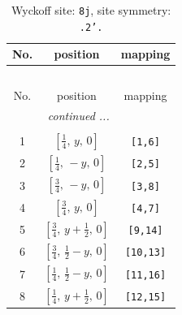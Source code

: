 \documentclass[fleqn,8pt]{jsarticle}
\begin{document}
\begin{longtable}{ccc}
\caption{Wyckoff site: {\tt 8j}, site symmetry: {\tt .2'.}}
 \\
 \hline \hline
No. & position & mapping \\ \hline \endfirsthead

\multicolumn{2}{l}{\tablename\ \thetable{}} \\
 \hline \hline
No. & position & mapping \\ \hline \endhead

 \hline \hline
\multicolumn{2}{r}{\footnotesize\it continued ...} \\ \endfoot

 \hline \hline
\multicolumn{2}{r}{} \\ \endlastfoot

1 & $\left[ \frac{1}{4},\, y,\, 0 \right]$ & {\tt [1,6]} \\ \hline
2 & $\left[ \frac{1}{4},\, - y,\, 0 \right]$ & {\tt [2,5]} \\ \hline
3 & $\left[ \frac{3}{4},\, - y,\, 0 \right]$ & {\tt [3,8]} \\ \hline
4 & $\left[ \frac{3}{4},\, y,\, 0 \right]$ & {\tt [4,7]} \\ \hline
5 & $\left[ \frac{3}{4},\, y + \frac{1}{2},\, 0 \right]$ & {\tt [9,14]} \\ \hline
6 & $\left[ \frac{3}{4},\, \frac{1}{2} - y,\, 0 \right]$ & {\tt [10,13]} \\ \hline
7 & $\left[ \frac{1}{4},\, \frac{1}{2} - y,\, 0 \right]$ & {\tt [11,16]} \\ \hline
8 & $\left[ \frac{1}{4},\, y + \frac{1}{2},\, 0 \right]$ & {\tt [12,15]} \\
\end{longtable}
\renewcommand{\arraystretch}{1.2}
\end{document}
